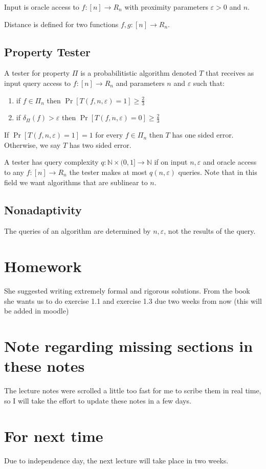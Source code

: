\documentclass{idc_msc}
\begin{document}
Input is oracle access to \(f : [n] \to R_n\) with proximity parameters \(\varepsilon > 0\) and \(n\).

Distance is defined for two functions \(f, g : [n] \to R_n\).


\subsection{Property Tester}

A tester for property \(\Pi\) is a probabilitistic algorithm denoted \(T\) that receives as input query access to \(f: [n] \to R_n\) and parameters \(n\) and \(\varepsilon\) such that:

\begin{enumerate}
  \item if \(f \in \Pi_n\) then \(\Pr[T(f, n ,\varepsilon) = 1] \ge \frac{2}{3}\)
  \item if \(\delta_\Pi(f) > \varepsilon\) then \(\Pr[T(f, n, \varepsilon) = 0] \ge \frac{2}{3}\)
\end{enumerate}

If \(\Pr[T(f, n, \varepsilon) = 1] = 1\) for every \(f \in \Pi_n\) then \(T\) has one sided error.
Otherwise, we say \(T\) has two sided error.

A tester has query complexity \(q : \mathbb{N} \times (0, 1] \to \mathbb{N}\) if on input \(n, \varepsilon\) and oracle access to any \(f : [n] \to R_n\) the tester makes at most \(q(n, \varepsilon)\) queries.
Note that in this field we want algorithms that are sublinear to \(n\).

\subsection{Nonadaptivity}

The queries of an algorithm are determined by \(n, \varepsilon\), not the results of the query.

\section{Homework}

She suggested writing extremely formal and rigorous solutions.
From the book she wants us to do exercise 1.1 and exercise 1.3 due two weeks from now (this will be added in moodle)

\section{Note regarding missing sections in these notes}

The lecture notes were scrolled a little too fast for me to scribe them in real time, so I will take the effort to update these notes in a few days.

\section{For next time}

  Due to independence day, the next lecture will take place in two weeks.
\end{document}
